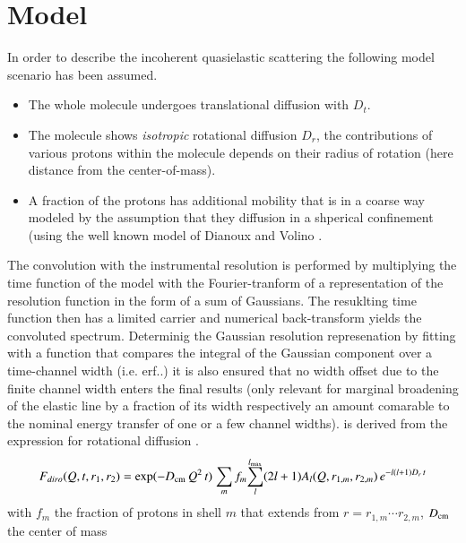 \documentclass{jpsj-suppl}
\begin{document}
\section{Model}
\label{sec:model}
In order to describe the incoherent quasielastic scattering the following model scenario 
has been assumed.
\begin{itemize}
\item The whole molecule undergoes translational diffusion with $D_t$.
\item The molecule shows {\it isotropic} rotational diffusion $D_r$, the contributions
of various protons within the molecule depends on their radius of rotation (here distance from
the center-of-mass). 
\item A fraction of the protons has additional mobility that is in a coarse way modeled by
the assumption that they diffusion in a shperical confinement (using the well known model
of Dianoux and Volino \cite{volino80vo}. 
\end{itemize}
The convolution with the instrumental resolution is performed by multiplying the time function
of the model with the Fourier-tranform of a representation of the resolution function in the form
of a sum of Gaussians. The resuklting time function then has a limited carrier and numerical back-transform
yields the convoluted spectrum.
Determinig the Gaussian resolution represenation by fitting with a function that compares the integral
of the Gaussian component over a time-channel width (i.e. erf..) it is also ensured that no
width offset due to the finite channel width enters the final results (only relevant for marginal
broadening of the elastic line by a fraction of its width respectively an amount comarable to the
nominal energy transfer of one or a few channel widths).  
%
%
%       
%
is derived from the expression for rotational diffusion \cite{sears66seaa}. 
\begin{equation}
\label{eq:dirosp}
F_{diro}(Q,t,r_1,r_2) = \exp(-D_{\rm cm} \, Q^2 \, t) \; { \sum_m f_m { \sum_l^{l_{\rm max}} (2l+1) A_l(Q,r_{1,m},r_{2,m}) \, e^{-l(l+1)D_r\,t}  } }  
\end{equation}
with $f_m$ the fraction of protons in shell $m$ that extends from $r=r_{1,m} \cdots r_{2,m}$, $D_{\rm cm}$ the center of mass
\end{document}
